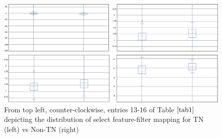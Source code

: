 \documentclass[10pt,final,1p,times,twocolumn]{elsarticle}
\begin{document}
\begin{figure}[hbt!]
\centering
\includegraphics[width=14cm]{13-16.png}
\caption{From top left, counter-clockwise, entries 13-16 of Table $\ref{tab1}$ depicting the distribution of select feature-filter mapping for TN (left) vs Non-TN (right)}
\label{13-16}
\end{figure}
\end{document}
